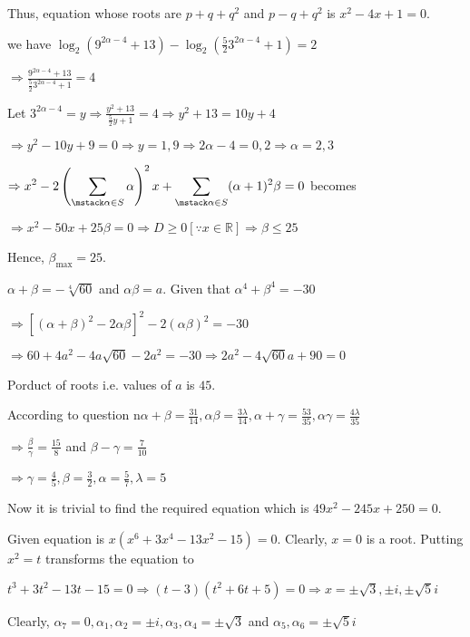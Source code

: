   Thus, equation whose roots are $p + q + q^2$ and $p - q + q^2$ is $x^2 - 4x + 1 = 0$.
\item we have $\log_2\left(9^{2\alpha - 4} + 13\right) - \log_2\left(\frac{5}{2}3^{2\alpha - 4} + 1\right) =
  2$

  $\Rightarrow \frac{9^{2\alpha - 4} + 13}{\frac{5}{2}3^{2\alpha - 4} + 1} = 4$

  Let $3^{2\alpha - 4} = y\Rightarrow \frac{y^2 + 13}{\frac{5}{2}y + 1} = 4 \Rightarrow y^2 + 13 = 10y + 4$

  $\Rightarrow y^2 - 10y + 9 = 0 \Rightarrow y = 1, 9\Rightarrow 2\alpha - 4 = 0, 2\Rightarrow \alpha
  = 2, 3$

  $\Rightarrow \displaystyle x^2 - 2\left(\sum_{\mstack \alpha\in S}\alpha\right)^2x
  + \sum_{\mstack \alpha\in S}(\alpha + 1)^2\beta = 0$ becomes

  $\Rightarrow x^2 - 50x + 25\beta = 0 \Rightarrow D \geq 0[\because x\in\mathbb{R}]\Rightarrow \beta\leq
  25$

  Hence, $\beta_{\max} = 25$.
\item $\alpha + \beta = -\sqrt[4]{60}$ and $\alpha\beta = a$. Given that $\alpha^4 + \beta^4 = -30$

  $\Rightarrow \left[\left(\alpha + \beta\right)^2 - 2\alpha\beta\right]^2 - 2(\alpha\beta)^2 = -30$

  $\Rightarrow 60 + 4a^2- 4a\sqrt{60} - 2a^2 = -30\Rightarrow 2a^2 - 4\sqrt{60}a + 90 = 0$

  Porduct of roots i.e. values of $a$ is $45$.
\item According to question n$\alpha + \beta = \frac{31}{14}, \alpha\beta = \frac{3\lambda}{14}, \alpha
  + \gamma = \frac{53}{35}, \alpha\gamma = \frac{4\lambda}{35}$

  $\Rightarrow \frac{\beta}{\gamma} = \frac{15}{8}$ and $\beta - \gamma = \frac{7}{10}$

  $\Rightarrow \gamma = \frac{4}{5}, \beta = \frac{3}{2}, \alpha = \frac{5}{7}, \lambda = 5$

  Now it is trivial to find the required equation which is $49x^2 - 245x + 250 = 0$.
\item Given equation is $x\left(x^6 + 3x^4 - 13x^2 - 15\right) = 0$. Clearly, $x = 0$ is a root. Putting
  $x^2 = t$ transforms the equation to

  $t^3 + 3t^2 - 13t - 15 = 0 \Rightarrow (t - 3)(t^2 + 6t + 5) = 0 \Rightarrow x = \pm\sqrt{3}, \pm
  i, \pm\sqrt{5}i$

  Clearly, $\alpha_7 = 0, \alpha_1,\alpha_2 = \pm i, \alpha_3,\alpha_4 = \pm\sqrt{3}$ and
  $\alpha_5, \alpha_6 = \pm\sqrt{5}i$

